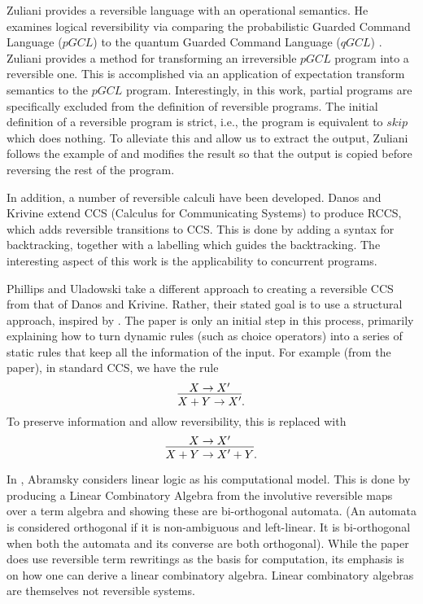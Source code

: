 Zuliani \cite{zuliani01:reversibility} provides a reversible language with an operational
semantics. He examines logical reversibility via comparing the probabilistic Guarded Command
Language ($pGCL$) \cite{MorganIver99} to the quantum Guarded Command Language ($qGCL$)
\cite{sanders:quantum}. Zuliani provides a method for transforming an irreversible $pGCL$ program
into a reversible one. This is accomplished via an application of expectation transform semantics to
the $pGCL$ program. Interestingly, in this work, partial programs are specifically excluded from the
definition of reversible programs. The initial definition of a reversible program is strict, i.e.,
the program is equivalent to $skip$ which does nothing. To alleviate this and allow us to extract
the output, Zuliani follows the example of \cite{bennett:1973reverse} and modifies the result so
that the output is copied before reversing the rest of the program.

In addition, a number of reversible calculi have been developed. Danos and Krivine
\cite{danos2004reversible} extend CCS (Calculus for Communicating Systems)
\cite{milner1980calculus,milner1989communication} to produce RCCS, which adds reversible
transitions to CCS. This is done by adding a syntax for backtracking, together with a labelling
which guides the backtracking. The interesting aspect of this work is the applicability to
concurrent programs.

Phillips and Uladowski \cite{phillips2006operational} take a different approach to creating a
reversible CCS from that of Danos and Krivine. Rather, their stated goal is to use a structural
approach, inspired by \cite{abramsky05:reversible}. The paper is only an initial step in this
process, primarily explaining how to turn dynamic rules (such as choice operators) into a series of
static rules that keep all the information of the input. For example (from the paper), in standard
CCS, we have the rule
\[
  \infer{X+Y \to X'}{X\to X'}.
\]
To preserve information and allow reversibility, this is replaced with
\[
  \infer{X+Y \to X' +Y}{X\to X'}.
\]

In \cite{abramsky05:reversible}, Abramsky considers linear logic as his computational model. This is
done by producing a Linear Combinatory Algebra \cite{abramsky02:GOI} from the involutive reversible
maps over a term algebra and showing these are bi-orthogonal automata. (An automata is considered
orthogonal if it is non-ambiguous and left-linear. It is bi-orthogonal when both the automata and
its converse are both orthogonal). While the paper does use reversible term rewritings as the
basis for computation, its emphasis is on how one can derive a linear combinatory algebra.
Linear combinatory algebras are themselves not reversible systems.

